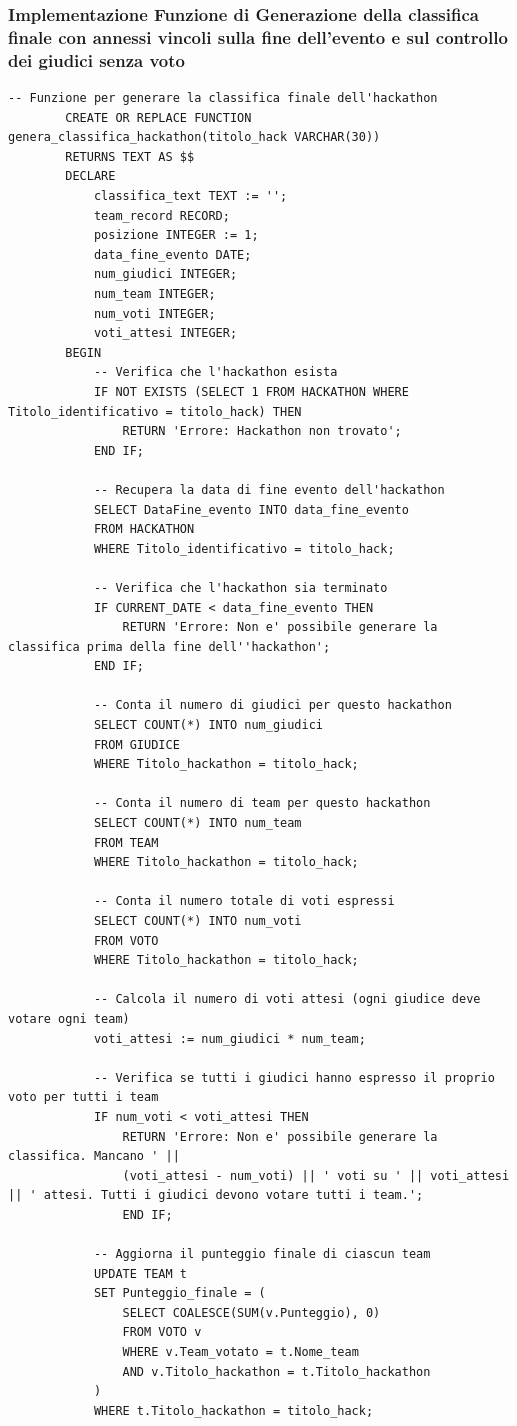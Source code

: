 \documentclass[a4paper, 10pt]{article}
\begin{document}
	\subsubsection{Implementazione Funzione di Generazione della classifica finale con annessi vincoli sulla fine dell'evento e sul controllo dei giudici senza voto}
	\begin{lstlisting}[style=sqlstyle]
		-- Funzione per generare la classifica finale dell'hackathon
		CREATE OR REPLACE FUNCTION genera_classifica_hackathon(titolo_hack VARCHAR(30))
		RETURNS TEXT AS $$
		DECLARE
			classifica_text TEXT := '';
			team_record RECORD;
			posizione INTEGER := 1;
			data_fine_evento DATE;
			num_giudici INTEGER;
			num_team INTEGER;
			num_voti INTEGER;
			voti_attesi INTEGER;
		BEGIN
			-- Verifica che l'hackathon esista
			IF NOT EXISTS (SELECT 1 FROM HACKATHON WHERE Titolo_identificativo = titolo_hack) THEN
				RETURN 'Errore: Hackathon non trovato';
			END IF;
			
			-- Recupera la data di fine evento dell'hackathon
			SELECT DataFine_evento INTO data_fine_evento
			FROM HACKATHON
			WHERE Titolo_identificativo = titolo_hack;
			
			-- Verifica che l'hackathon sia terminato
			IF CURRENT_DATE < data_fine_evento THEN
				RETURN 'Errore: Non e' possibile generare la classifica prima della fine dell''hackathon';
			END IF;
			
			-- Conta il numero di giudici per questo hackathon
			SELECT COUNT(*) INTO num_giudici
			FROM GIUDICE
			WHERE Titolo_hackathon = titolo_hack;
			
			-- Conta il numero di team per questo hackathon
			SELECT COUNT(*) INTO num_team
			FROM TEAM
			WHERE Titolo_hackathon = titolo_hack;
			
			-- Conta il numero totale di voti espressi
			SELECT COUNT(*) INTO num_voti
			FROM VOTO
			WHERE Titolo_hackathon = titolo_hack;
			
			-- Calcola il numero di voti attesi (ogni giudice deve votare ogni team)
			voti_attesi := num_giudici * num_team;
			
			-- Verifica se tutti i giudici hanno espresso il proprio voto per tutti i team
			IF num_voti < voti_attesi THEN
				RETURN 'Errore: Non e' possibile generare la classifica. Mancano ' || 
				(voti_attesi - num_voti) || ' voti su ' || voti_attesi || ' attesi. Tutti i giudici devono votare tutti i team.';
				END IF;
			
			-- Aggiorna il punteggio finale di ciascun team
			UPDATE TEAM t
			SET Punteggio_finale = (
				SELECT COALESCE(SUM(v.Punteggio), 0)
				FROM VOTO v
				WHERE v.Team_votato = t.Nome_team
				AND v.Titolo_hackathon = t.Titolo_hackathon
			)
			WHERE t.Titolo_hackathon = titolo_hack;
			

\end{lstlisting}
\end{document}
